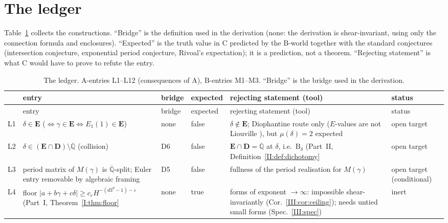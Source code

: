 \documentclass[11pt,a4paper]{article}
\newcommand{\Qbar}{\overline{\mathbb Q}}
\newcommand{\EE}{\mathbf E}
\newcommand{\DD}{\mathbf D}
\theoremstyle{definition}
\theoremstyle{remark}
\numberwithin{equation}{section}
\begin{document}
\section{The ledger}\label{III:sec:ledger}

Table~\ref{III:tab:ledger} collects the constructions. ``Bridge'' is the definition used in
the derivation (none: the derivation is shear-invariant, using only the connection
formula and enclosures). ``Expected'' is the truth value in $\mathrm C$ predicted by the
$\mathrm B$-world together with the standard conjectures (intersection conjecture,
exponential period conjecture, Rivoal's expectation); it is a prediction, not a theorem.
``Rejecting statement'' is what $\mathrm C$ would have to prove to refute the entry.

\begin{footnotesize}
\begin{longtable}{@{}>{\raggedright\arraybackslash}p{6mm}>{\raggedright\arraybackslash}p{42mm}>{\raggedright\arraybackslash}p{12mm}>{\raggedright\arraybackslash}p{13mm}>{\raggedright\arraybackslash}p{40mm}>{\raggedright\arraybackslash}p{24mm}@{}}
\caption{The ledger. $\mathrm A$-entries L1--L12 (consequences of $\mathrm A$),
$\mathrm B$-entries M1--M3. ``Bridge'' is the bridge used in the derivation.}\label{III:tab:ledger}\\
\toprule
& entry & bridge & expected & rejecting statement (tool) & status\\
\midrule
\endfirsthead
\toprule
& entry & bridge & expected & rejecting statement (tool) & status\\
\midrule
\endhead
L1 & $\delta\in\EE$ ($\Leftrightarrow\gamma\in\EE\Leftrightarrow E_1(1)\in\EE$) & none & false & $\delta\notin\EE$; Diophantine route only ($E$-values are not Liouville \cite{FRliouville}), but $\mu(\delta)=2$ expected & open target\\
L2 & $\delta\in(\EE\cap\DD)\setminus\Qbar$ (collision) & D6 & false & $\EE\cap\DD=\Qbar$ at $\delta$, i.e.\ $\mathrm B_\delta$ (Part~II, Definition~\ref{II:def:dichotomy} & open target\\
L3 & period matrix of $M(\gamma)$ is $\Qbar$-split; Euler entry removable by algebraic framing & D5 & false & fullness of the period realisation for $M(\gamma)$ \cite{FJ,K002} & open target (conditional)\\
L4 & floor $|a+b\gamma+c\delta|\ge c_\varepsilon H^{-(d3^d-1)-\varepsilon}$ (Part~I, Theorem~\ref{I:thm:floor} & none & true & forms of exponent $\to\infty$: impossible shear-invariantly (Cor.~\ref{III:cor:ceiling}); needs untied small forms (Spec.~\ref{III:spec}) & inert\\

\end{longtable}
\end{footnotesize}
\end{document}
